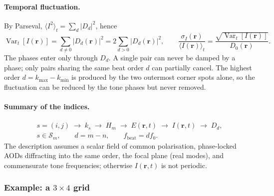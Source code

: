 \paragraph{Temporal fluctuation.}
By Parseval, $\langle I^2\rangle_t=\sum_d|D_d|^2$, hence
\begin{equation}
\operatorname{Var}_t[I(\mathbf r)]
=\sum_{d\neq0}\left|D_d(\mathbf r)\right|^2
=2\sum_{d>0}\left|D_d(\mathbf r)\right|^2,
\qquad
\frac{\sigma_I(\mathbf r)}{\langle I(\mathbf r)\rangle_t}
=\frac{\sqrt{\operatorname{Var}_t[I(\mathbf r)]}}{D_0(\mathbf r)} .
\end{equation}
The phases enter only through $D_d$. A single pair can never be damped by a
phase; only pairs sharing the same beat order $d$ can partially cancel. The
highest order $d=k_{\max}-k_{\min}$ is produced by the two outermost corner
spots alone, so the fluctuation can be reduced by the tone phases but never
removed.

\paragraph{Summary of the indices.}
\begin{gather}
s=(i,j)\;\longrightarrow\;k_s\;\longrightarrow\;H_m\;\longrightarrow\;
E(\mathbf r,t)\;\longrightarrow\;I(\mathbf r,t)\;\longrightarrow\;D_d,
\\
s\in\mathcal S_m,\qquad d=m-n,\qquad f_\mathrm{beat}=d f_0 .
\end{gather}
The description assumes a scalar field of common polarisation, phase-locked
AODs diffracting into the same order, the focal plane (real modes), and
commensurate tone frequencies; otherwise $I(\mathbf r,t)$ is not periodic.

\subsubsection{Example: a $3\times4$ grid}

